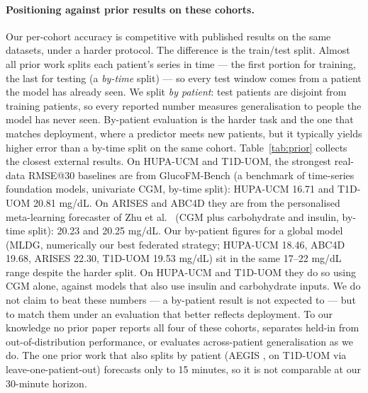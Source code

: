 \documentclass[10pt,letterpaper]{article}
\begin{document}
\paragraph{Positioning against prior results on these cohorts.} Our
per-cohort accuracy is competitive with published results on the same
datasets, under a harder protocol. The difference is the train/test split.
Almost all prior work splits each patient's series in time --- the first
portion for training, the last for testing (a \emph{by-time} split) --- so
every test window comes from a patient the model has already seen. We split
\emph{by patient}: test patients are disjoint from training patients, so every
reported number measures generalisation to people the model has never seen.
By-patient evaluation is the harder task and the one that matches deployment,
where a predictor meets new patients, but it typically yields higher error
than a by-time split on the same cohort. Table~\ref{tab:prior} collects the
closest external results. On HUPA-UCM and T1D-UOM, the strongest real-data
RMSE@30 baselines are from GlucoFM-Bench \cite{lu2026glucofmbench} (a
benchmark of time-series foundation models, univariate CGM, by-time split):
HUPA-UCM 16.71 and T1D-UOM 20.81 mg/dL. On ARISES and ABC4D they are from the
personalised meta-learning forecaster of Zhu et al.\ \cite{zhu2023fcnn} (CGM
plus carbohydrate and insulin, by-time split): 20.23 and 20.25 mg/dL. Our
by-patient figures for a global model (MLDG, numerically our best federated
strategy; HUPA-UCM 18.46, ABC4D 19.68, ARISES 22.30, T1D-UOM 19.53 mg/dL) sit
in the same 17--22 mg/dL range despite the harder split. On HUPA-UCM and
T1D-UOM they do so using CGM alone, against models that also use insulin and
carbohydrate inputs. We do not claim to beat these numbers --- a by-patient
result is not expected to --- but to match them under an evaluation that
better reflects deployment. To our knowledge no prior paper reports all four
of these cohorts, separates held-in from out-of-distribution performance, or
evaluates across-patient generalisation as we do. The one prior work that
also splits by patient (AEGIS \cite{pansheriya2026aegis}, on T1D-UOM via
leave-one-patient-out) forecasts only to 15 minutes, so it is not comparable
at our 30-minute horizon.
\end{document}
